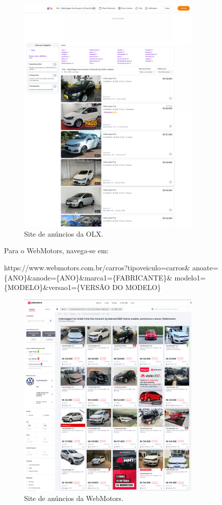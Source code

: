 \documentclass[conference]{IEEEtran}
\begin{document}
\begin{figure}[h!]
	\centerline{\includegraphics[width=250pt]{assets/olx.png}}
	\caption{Site de anúncios da OLX.}
	\label{fig5}
\end{figure}

Para o WebMotors, navega-se em:

https://www.webmotors.com.br/carros?tipoveiculo=carros\& anoate=\{ANO\}\&anode=\{ANO\}\&marca1=\{FABRICANTE\}\& modelo1=\{MODELO\}\&versao1=\{VERSÃO DO MODELO\}


\begin{figure}[h!]
	\centerline{\includegraphics[width=250pt]{assets/webmotors.png}}
	\caption{Site de anúncios da WebMotors.}
	\label{fig5}
\end{figure}
\end{document}

